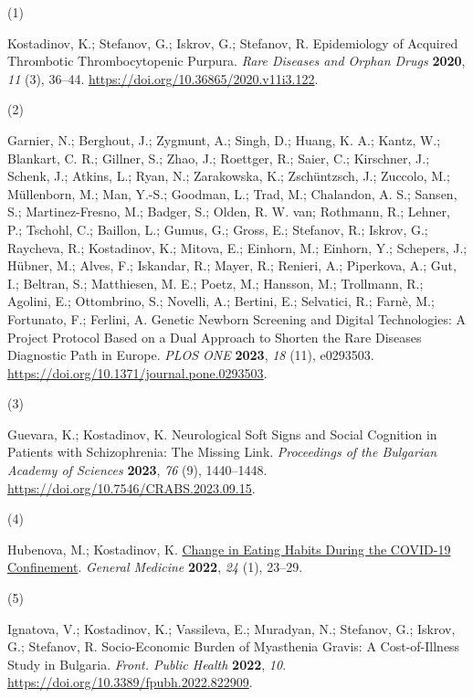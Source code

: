\documentclass[
  12pt,
  letterpaper,
  DIV=11,
  numbers=noendperiod]{scrartcl}
\newlength{\cslhangindent}
\newlength{\csllabelwidth}
\newenvironment{CSLReferences}[2] %
 {\begin{list}{}{%
  \setlength{\itemindent}{0pt}
  \setlength{\leftmargin}{0pt}
  \setlength{\parsep}{0pt}
  \ifodd #1
   \setlength{\leftmargin}{\cslhangindent}
   \setlength{\itemindent}{-1\cslhangindent}
  \fi
  \setlength{\itemsep}{#2\baselineskip}}}
 {\end{list}}
\newcommand{\CSLLeftMargin}[1]{\parbox[t]{\csllabelwidth}{\strut#1\strut}}
\newcommand{\CSLRightInline}[1]{\parbox[t]{\linewidth - \csllabelwidth}{\strut#1\strut}}
\begin{document}
\label{refs}
\begin{CSLReferences}{0}{0}
\nocite{*}

\CSLLeftMargin{(1) }%
\CSLRightInline{Kostadinov, K.; Stefanov, G.; Iskrov, G.; Stefanov, R.
Epidemiology of Acquired Thrombotic Thrombocytopenic Purpura. \emph{Rare
Diseases and Orphan Drugs} \textbf{2020}, \emph{11} (3), 36--44.
\url{https://doi.org/10.36865/2020.v11i3.122}.}

\CSLLeftMargin{(2) }%
\CSLRightInline{Garnier, N.; Berghout, J.; Zygmunt, A.; Singh, D.;
Huang, K. A.; Kantz, W.; Blankart, C. R.; Gillner, S.; Zhao, J.;
Roettger, R.; Saier, C.; Kirschner, J.; Schenk, J.; Atkins, L.; Ryan,
N.; Zarakowska, K.; Zschüntzsch, J.; Zuccolo, M.; Müllenborn, M.; Man,
Y.-S.; Goodman, L.; Trad, M.; Chalandon, A. S.; Sansen, S.;
Martinez-Fresno, M.; Badger, S.; Olden, R. W. van; Rothmann, R.; Lehner,
P.; Tschohl, C.; Baillon, L.; Gumus, G.; Gross, E.; Stefanov, R.;
Iskrov, G.; Raycheva, R.; Kostadinov, K.; Mitova, E.; Einhorn, M.;
Einhorn, Y.; Schepers, J.; Hübner, M.; Alves, F.; Iskandar, R.; Mayer,
R.; Renieri, A.; Piperkova, A.; Gut, I.; Beltran, S.; Matthiesen, M. E.;
Poetz, M.; Hansson, M.; Trollmann, R.; Agolini, E.; Ottombrino, S.;
Novelli, A.; Bertini, E.; Selvatici, R.; Farnè, M.; Fortunato, F.;
Ferlini, A. Genetic Newborn Screening and Digital Technologies: A
Project Protocol Based on a Dual Approach to Shorten the Rare Diseases
Diagnostic Path in Europe. \emph{PLOS ONE} \textbf{2023}, \emph{18}
(11), e0293503. \url{https://doi.org/10.1371/journal.pone.0293503}.}

\CSLLeftMargin{(3) }%
\CSLRightInline{Guevara, K.; Kostadinov, K. Neurological Soft Signs and
Social Cognition in Patients with Schizophrenia: The Missing Link.
\emph{Proceedings of the Bulgarian Academy of Sciences} \textbf{2023},
\emph{76} (9), 1440--1448.
\url{https://doi.org/10.7546/CRABS.2023.09.15}.}

\CSLLeftMargin{(4) }%
\CSLRightInline{Hubenova, M.; Kostadinov, K.
\href{https://www.scopus.com/inward/record.uri?eid=2-s2.0-85131335656&partnerID=40&md5=960321f2fcf677479ecd9d43d8f6d6d0}{Change
in Eating Habits During the COVID-19 Confinement}. \emph{General
Medicine} \textbf{2022}, \emph{24} (1), 23--29.}

\CSLLeftMargin{(5) }%
\CSLRightInline{Ignatova, V.; Kostadinov, K.; Vassileva, E.; Muradyan,
N.; Stefanov, G.; Iskrov, G.; Stefanov, R. Socio-Economic Burden of
Myasthenia Gravis: A Cost-of-Illness Study in Bulgaria. \emph{Front.
Public Health} \textbf{2022}, \emph{10}.
\url{https://doi.org/10.3389/fpubh.2022.822909}.}


\end{CSLReferences}
\end{document}
